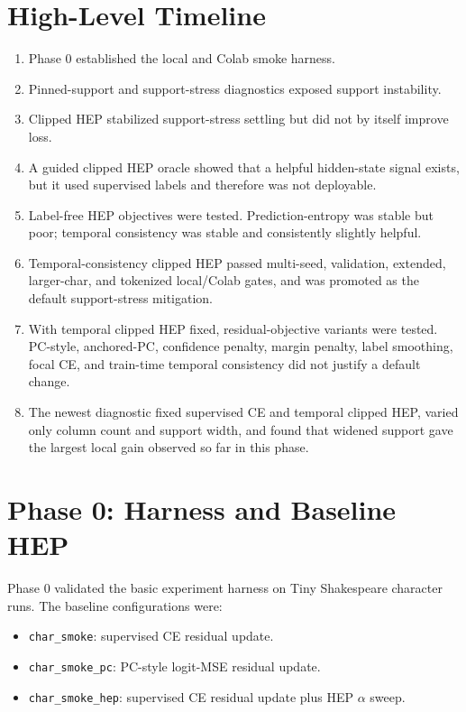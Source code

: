 \documentclass[11pt]{article}
\begin{document}
\section{High-Level Timeline}

\begin{enumerate}
  \item Phase 0 established the local and Colab smoke harness.
  \item Pinned-support and support-stress diagnostics exposed support
  instability.
  \item Clipped HEP stabilized support-stress settling but did not by itself
  improve loss.
  \item A guided clipped HEP oracle showed that a helpful hidden-state signal
  exists, but it used supervised labels and therefore was not deployable.
  \item Label-free HEP objectives were tested. Prediction-entropy was stable
  but poor; temporal consistency was stable and consistently slightly helpful.
  \item Temporal-consistency clipped HEP passed multi-seed, validation,
  extended, larger-char, and tokenized local/Colab gates, and was promoted as
  the default support-stress mitigation.
  \item With temporal clipped HEP fixed, residual-objective variants were
  tested. PC-style, anchored-PC, confidence penalty, margin penalty, label
  smoothing, focal CE, and train-time temporal consistency did not justify a
  default change.
  \item The newest diagnostic fixed supervised CE and temporal clipped HEP,
  varied only column count and support width, and found that widened support
  gave the largest local gain observed so far in this phase.
\end{enumerate}

\section{Phase 0: Harness and Baseline HEP}

Phase 0 validated the basic experiment harness on Tiny Shakespeare character
runs. The baseline configurations were:

\begin{itemize}
  \item \texttt{char\_smoke}: supervised CE residual update.
  \item \texttt{char\_smoke\_pc}: PC-style logit-MSE residual update.
  \item \texttt{char\_smoke\_hep}: supervised CE residual update plus HEP
  $\alpha$ sweep.
\end{itemize}
\end{document}
